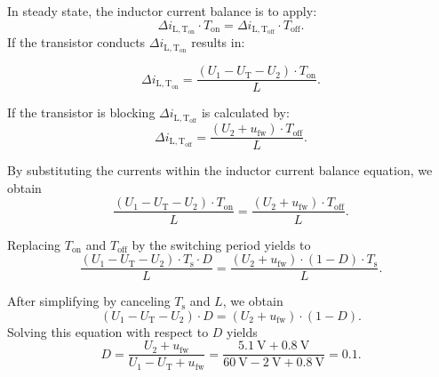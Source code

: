 \begin{solutionblock}
    In steady state, the inductor current balance is to apply:
    \begin{equation*}
        \Delta i_\mathrm{L,T_\mathrm{on}} \cdot T_\mathrm{on}=\Delta i_\mathrm{L,T_\mathrm{off}} \cdot T_\mathrm{off}.
    \end{equation*}
    If the transistor conducts $\Delta i_\mathrm{L,T_\mathrm{on}}$ results in:

    \begin{equation*}
        \Delta i_\mathrm{L,T_\mathrm{on}}=\frac{(U_\mathrm{1}-U_\mathrm{T}-U_\mathrm{2}) \cdot T_\mathrm{on} }{L}.
    \end{equation*}

    If the transistor is blocking $\Delta i_\mathrm{L,T_\mathrm{off}}$ is calculated by:
    \begin{equation*}
        \Delta i_\mathrm{L,T_\mathrm{off}}=\frac{(U_\mathrm{2}+u_\mathrm{fw}) \cdot T_\mathrm{off}}{L}.
    \end{equation*}

    By substituting the currents within the inductor current balance equation, we obtain
    \begin{equation*}
        \frac{(U_\mathrm{1}-U_\mathrm{T}-U_\mathrm{2}) \cdot T_\mathrm{on}}{L}=\frac{(U_\mathrm{2}+u_\mathrm{fw}) \cdot T_\mathrm{off}}{L}.
    \end{equation*}

    Replacing $T_\mathrm{on}$ and $T_\mathrm{off}$ by the switching period yields to
    \begin{equation*}
        \frac{(U_\mathrm{1}-U_\mathrm{T}-U_\mathrm{2}) \cdot T_\mathrm{s} \cdot D}{L} =
        \frac{(U_\mathrm{2}+u_\mathrm{fw}) \cdot (1-D) \cdot T_\mathrm{s}}{L}.
    \end{equation*}

    After simplifying by canceling $T_\mathrm{s}$ and $L$, we obtain
    \begin{equation*}
        (U_\mathrm{1}-U_\mathrm{T}-U_\mathrm{2}) \cdot D =
        (U_\mathrm{2}+u_\mathrm{fw}) \cdot (1-D).
    \end{equation*}
    Solving this equation with respect to $D$ yields
    \begin{equation*}
        D = \frac{U_\mathrm{2}+u_\mathrm{fw}}{U_\mathrm{1}-U_\mathrm{T}+u_\mathrm{fw}} =
        \frac{\SI{5.1}{\volt}+\SI{0.8}{\volt}}{\SI{60}{\volt} - \SI{2}{\volt}+\SI{0.8}{\volt}}  = 0.1.
    \end{equation*}

\end{solutionblock}


